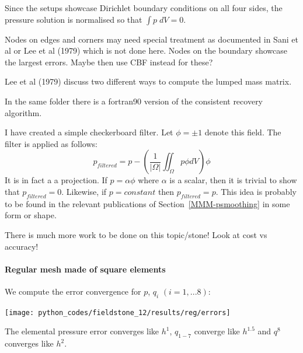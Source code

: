 Since the setups showcase Dirichlet boundary conditions on all four sides, 
the pressure solution is normalised so that $\int p\; dV =0 $.

\begin{remark}
Nodes on edges and corners may need special treatment as documented in Sani et al \cite{sagl81a} or
Lee et al (1979) \cite{legs79} which is not done here.  
Nodes on the boundary showcase the largest errors. Maybe then use CBF instead for these?
\end{remark}

\begin{remark}
Lee et al (1979) \cite{legs79} discuss two different ways to compute the lumped mass matrix. 
\end{remark}

\begin{remark}
In the same folder there is a fortran90 version of the consistent recovery algorithm.
\end{remark}

I have created a simple checkerboard filter. Let $\phi=\pm 1$ denote this field.
The filter is applied as follows:
\[
p_{filtered} = p - \left( \frac{1}{|\Omega|} \iint_\Omega p \phi dV \right) \phi
\]
It is in fact a a projection. If $p=\alpha \phi$  where $\alpha$ is a scalar, then 
it is trivial to show that $p_{filtered} =0$.
Likewise, if $p=constant$ then $p_{filtered}=p$.
This idea is probably to be found in the relevant publications of Section~\ref{MMM-psmoothing}
in some form or shape. 

There is much more work to be done on this topic/stone! Look at cost vs accuracy!

\newpage
\paragraph{Regular mesh made of square elements}

We compute the error convergence for $p$, $q_i$ $(i=1,...8)$:
\begin{center}
\texttt{[image: python\_codes/fieldstone\_12/results/reg/errors]}
\end{center}
The elemental pressure error converges like $h^1$, $q_{1-7}$ converge like $h^{1.5}$ and 
$q^8$ converges like $h^2$.


